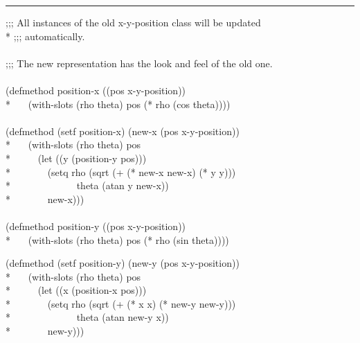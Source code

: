 \begin{defun}
\hrule width 0pt\relax
\begin{lisp}
;;; All instances of the old x-y-position class will be updated \\*
;;; automatically. \\
\\
;;; The new representation has the look and feel of the old one. \\
\\
(defmethod position-x ((pos x-y-position)) \\*
~~~(with-slots (rho theta) pos (* rho (cos theta)))) \\
\\
(defmethod (setf position-x) (new-x (pos x-y-position)) \\*
~~~(with-slots (rho theta) pos \\*
~~~~~(let ((y (position-y pos))) \\*
~~~~~~~(setq rho (sqrt (+ (* new-x new-x) (* y y))) \\*
~~~~~~~~~~~~~theta (atan y new-x)) \\*
~~~~~~~new-x))) \\
\\
(defmethod position-y ((pos x-y-position)) \\*
~~~(with-slots (rho theta) pos (* rho (sin theta))))
\end{lisp}
\begin{lisp}
(defmethod (setf position-y) (new-y (pos x-y-position)) \\*
~~~(with-slots (rho theta) pos \\*
~~~~~(let ((x (position-x pos))) \\*
~~~~~~~(setq rho (sqrt (+ (* x x) (* new-y new-y))) \\*
~~~~~~~~~~~~~theta (atan new-y x)) \\*
~~~~~~~new-y)))
\end{lisp}
\end{defun}

